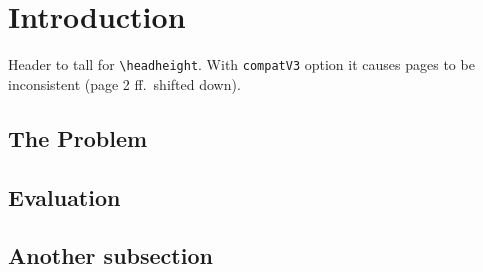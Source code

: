 \documentclass{article}
\begin{document}
\section{Introduction}

Header to tall for \verb|\headheight|. With \texttt{compatV3} option it causes pages to be inconsistent (page 2 ff.\ shifted down).

\subsection{The Problem}
\label{sec:problem}

\lipsum[1]

\subsection{Evaluation}

\lipsum

\subsection{Another subsection}

\lipsum[3]
\end{document}
